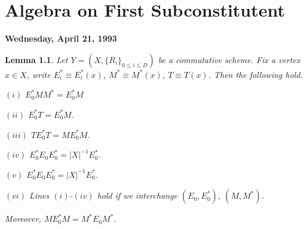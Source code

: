 \documentclass[
]{book}
\newtheorem{lemma}{Lemma}[chapter]
\theoremstyle{definition}
\theoremstyle{definition}
\theoremstyle{definition}
\theoremstyle{definition}
\theoremstyle{remark}
\begin{document}
\hypertarget{lec33}{%
\chapter{Algebra on First Subconstitutent}\label{lec33}}

\textbf{Wednesday, April 21, 1993}

\begin{lemma}
\protect\hypertarget{lem:mezerostarm}{}\label{lem:mezerostarm}Let \(Y = (X, \{R_i\}_{0\leq i\leq D})\) be a commutative scheme. Fix a vertex \(x\in X\), write \(E^*_i\equiv E^*_i(x)\), \(M^* \equiv M^*(x)\), \(T\equiv T(x)\). Then the following hold.

\((i)\) \(E^*_0MM^* = E^*_0M\)

\((ii)\) \(E^*_0T = E^*_0M\).

\((iii)\) \(TE^*_0T = ME^*_0M\).

\((iv)\) \(E^*_0E_0E^*_0 = |X|^{-1}E^*_0\).

\((v)\) \(E^*_0E_0E^*_0 = |X|^{-1}E^*_0\).

\((vi)\) Lines \((i)\)-\((iv)\) hold if we interchange \((E_0, E^*_0)\), \((M, M^*)\).

Moreover, \(ME^*_0M = M^*E_0M^*\).
\end{lemma}
\end{document}
